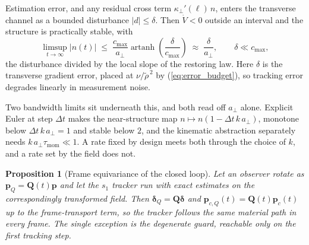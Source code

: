 \documentclass[lettersize,journal]{IEEEtran}
\newtheorem{proposition}{Proposition}
\begin{document}
Estimation error, and any residual cross term $\kappa_\perp'(\ell)\,n$,
enters the transverse channel as a bounded disturbance $|d| \leq
\delta$. Then $\dot{V} < 0$ outside an interval and the structure is
practically stable, with
\begin{equation}
    \limsup_{t\to\infty}|n(t)| \;\leq\;
    \frac{c_{\max}}{a_\perp}
    \operatorname{artanh}\!\left(\frac{\delta}{c_{\max}}\right)
    \;\approx\; \frac{\delta}{a_\perp},
    \qquad \delta \ll c_{\max},
    \label{eq:iss_bound}
\end{equation}
the disturbance divided by the local slope of the restoring law. Here
$\delta$ is the transverse gradient error, placed at
$\nu/\tilde{\rho}^{\,2}$ by (\ref{eq:error_budget}), so tracking error
degrades linearly in measurement noise.

Two bandwidth limits sit underneath this, and both read off $a_\perp$
alone. Explicit Euler at step $\Delta t$ makes the near-structure map $n
\mapsto n(1 - \Delta t\,k\,a_\perp)$, monotone below $\Delta t\,k\,
a_\perp = 1$ and stable below $2$, and the kinematic abstraction
separately needs $k\,a_\perp\tau_{\mathrm{mom}} \ll 1$. A rate fixed by
design meets both through the choice of $k$, and a rate set by the field
does not.

\begin{proposition}[Frame equivariance of the closed loop]
\label{prop:equivariance}
Let an observer rotate as $\mathbf{p}_Q = \mathbf{Q}(t)\mathbf{p}$ and
let the $s_1$ tracker run with exact estimates on the correspondingly
transformed field. Then $\boldsymbol{\delta}_Q =
\mathbf{Q}\boldsymbol{\delta}$ and $\mathbf{p}_{c,Q}(t) =
\mathbf{Q}(t)\mathbf{p}_c(t)$ up to the frame-transport term, so the
tracker follows the same material path in every frame. The single
exception is the degenerate guard, reachable only on the first tracking
step.
\end{proposition}
\end{document}
